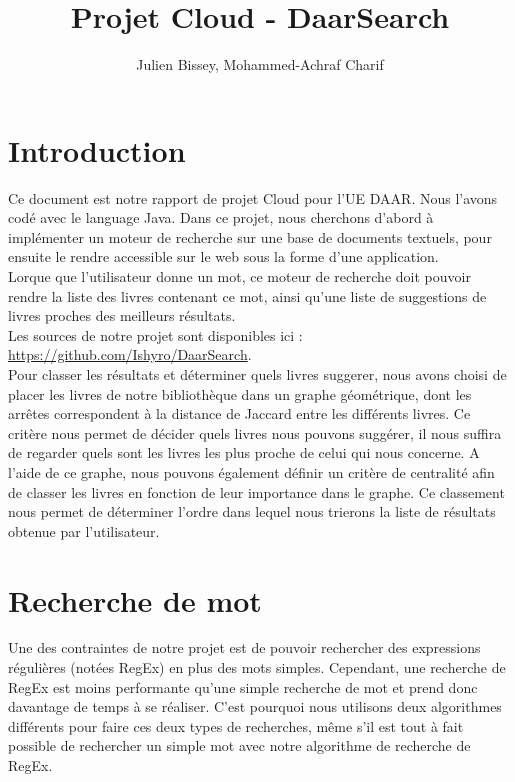 \documentclass{article}
\title{Projet Cloud - DaarSearch}
\author{Julien Bissey, Mohammed-Achraf Charif}
\begin{document}
\maketitle

\section*{Introduction}

Ce document est notre rapport de projet Cloud pour l'UE DAAR. Nous l'avons codé avec le language Java. Dans ce projet, nous cherchons d'abord à implémenter un moteur de recherche sur une base de documents textuels, pour ensuite le rendre accessible sur le web sous la forme d'une application.\\
Lorque que l'utilisateur donne un mot, ce moteur de recherche doit pouvoir rendre la liste des livres contenant ce mot, ainsi qu'une liste de suggestions de livres proches des meilleurs résultats.\\
Les sources de notre projet sont disponibles ici : \url{https://github.com/Ishyro/DaarSearch}.\\
Pour classer les résultats et déterminer quels livres suggerer, nous avons choisi de placer les livres de notre bibliothèque dans un graphe géométrique, dont les arrêtes correspondent à la distance de Jaccard entre les différents livres. Ce critère nous permet de décider quels livres nous pouvons suggérer, il nous suffira de regarder quels sont les livres les plus proche de celui qui nous concerne. A l'aide de ce graphe, nous pouvons également définir un critère de centralité afin de classer les livres en fonction de leur importance dans le graphe. Ce classement nous permet de déterminer l'ordre dans lequel nous trierons la liste de résultats obtenue par l'utilisateur.

\section{Recherche de mot}

Une des contraintes de notre projet est de pouvoir rechercher des expressions régulières (notées RegEx) en plus des mots simples. Cependant, une recherche de RegEx est moins performante qu'une simple recherche de mot et prend donc davantage de temps à se réaliser. C'est pourquoi nous utilisons deux algorithmes différents pour faire ces deux types de recherches, même s'il est tout à fait possible de rechercher un simple mot avec notre algorithme de recherche de RegEx.
\end{document}
